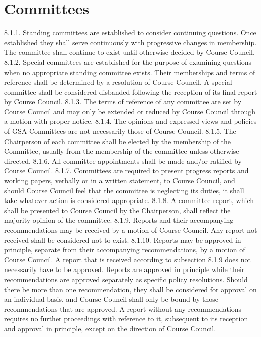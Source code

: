 \section{Committees }
8.1.1. Standing committees are established to consider continuing questions. 
Once established they shall serve continuously with progressive 
changes in membership. The committee shall continue to exist until 
otherwise decided by Course Council. 
8.1.2. Special committees are established for the purpose of examining 
questions when no appropriate standing committee exists. Their 
memberships and terms of reference shall be determined by a 
resolution of Course Council. A special committee shall be considered 
disbanded following the reception of its final report by Course 
Council. 
8.1.3. The terms of reference of any committee are set by Course Council 
and may only be extended or reduced by Course Council through a 
motion with proper notice. 
8.1.4. The opinions and expressed views and policies of GSA Committees 
are not necessarily those of Course Council. 
8.1.5. The Chairperson of each committee shall be elected by the 
membership of the Committee, usually from the membership of the 
committee unless otherwise directed. 
8.1.6. All committee appointments shall be made and/or ratified by Course 
Council. 
8.1.7. Committees are required to present progress reports and working 
papers, verbally or in a written statement, to Course Council, and 
should Course Council feel that the committee is neglecting its duties, 
it shall take whatever action is considered appropriate. 
8.1.8. A committee report, which shall be presented to Course Council by the 
Chairperson, shall reflect the majority opinion of the committee. 
8.1.9. Reports and their accompanying recommendations may be received by 
a motion of Course Council. Any report not received shall be 
considered not to exist. 
8.1.10. Reports may be approved in principle, separate from their 
accompanying recommendations, by a motion of Course Council. A 
report that is received according to subsection 8.1.9 does not 
necessarily have to be approved. Reports are approved in principle 
while their recommendations are approved separately as specific 
policy resolutions. Should there be more than one recommendation, 
they shall be considered for approval on an individual basis, and 
Course Council shall only be bound by those recommendations that 
are approved. A report without any recommendations requires no 
further proceedings with reference to it, subsequent to its reception and 
approval in principle, except on the direction of Course Council. 
